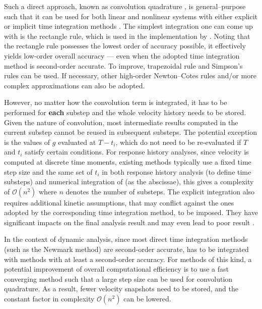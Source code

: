 Such a direct approach, known as convolution quadrature \citep[see][and the references therein]{Lubich2004}, is general--purpose such that it can be used for both linear and nonlinear systems with either explicit or implicit time integration methods \citep[see, e.g.,][]{Katsikadelis2019}. The simplest integration one can come up with is the rectangle rule, which is used in the implementation by \citet{Puthanpurayil2014}. Noting that the rectangle rule possesses the lowest order of accuracy possible, it effectively yields low-order overall accuracy --- even when the adopted time integration method is second-order accurate. To improve, trapezoidal rule \citep[e.g.,][]{Liu2014} and Simpson's rules \citep[e.g.,][]{Shen2019} can be used. If necessary, other high-order Newton--Cotes rules and/or more complex approximations \citep{Schaedle2006,Shen2021} can also be adopted.

However, no matter how the convolution term is integrated, it has to be performed for \textbf{each} substep and the whole velocity history needs to be stored. Given the nature of convolution, most intermediate results computed in the current substep cannot be reused in subsequent substeps. The potential exception is the values of $g$ evaluated at $T-t_i$, which do not need to be re-evaluated if $T$ and $t_i$ satisfy certain conditions. For response history analyses, since velocity is computed at discrete time moments, existing methods typically use a fixed time step size and the same set of $t_i$ in both response history analysis (to define time substeps) and numerical integration of  (as the abscissae), this gives a complexity of $\mathcal{O}\left(n^2\right)$ where $n$ denotes the number of substeps. The explicit integration also requires additional kinetic assumptions, that may conflict against the ones adopted by the corresponding time integration method, to be imposed. They have significant impacts on the final analysis result \citep[see][]{Liu2014} and may even lead to poor result \cite[see][Figs. 12, 17, 25, 26]{Liu2023}.

In the context of dynamic analysis, since most direct time integration methods (such as the Newmark method) are second-order accurate,  has to be integrated with methods with at least a second-order accuracy. For methods of this kind, a potential improvement of overall computational efficiency is to use a fast converging method \citep{Schaedle2006} such that a large step size can be used for convolution quadrature. As a result, fewer velocity snapshots need to be stored, and the constant factor in complexity $\mathcal{O}\left(n^2\right)$ can be lowered.

